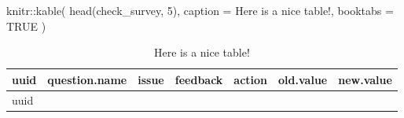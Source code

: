 \documentclass[
  letterpaper,
  DIV=11,
  numbers=noendperiod]{scrreprt}
\newenvironment{Shaded}{\begin{snugshade}}{\end{snugshade}}
\newcommand{\AttributeTok}[1]{\textcolor[rgb]{0.40,0.45,0.13}{#1}}
\newcommand{\ConstantTok}[1]{\textcolor[rgb]{0.56,0.35,0.01}{#1}}
\newcommand{\DecValTok}[1]{\textcolor[rgb]{0.68,0.00,0.00}{#1}}
\newcommand{\FunctionTok}[1]{\textcolor[rgb]{0.28,0.35,0.67}{#1}}
\newcommand{\NormalTok}[1]{\textcolor[rgb]{0.00,0.23,0.31}{#1}}
\newcommand{\SpecialCharTok}[1]{\textcolor[rgb]{0.37,0.37,0.37}{#1}}
\newcommand{\StringTok}[1]{\textcolor[rgb]{0.13,0.47,0.30}{#1}}
\begin{document}
\begin{Shaded}
\begin{Highlighting}[]
\NormalTok{knitr}\SpecialCharTok{::}\FunctionTok{kable}\NormalTok{(}
  \FunctionTok{head}\NormalTok{(check\_survey, }\DecValTok{5}\NormalTok{), }\AttributeTok{caption =} \StringTok{\textquotesingle{}Here is a nice table!\textquotesingle{}}\NormalTok{,}
  \AttributeTok{booktabs =} \ConstantTok{TRUE}
\NormalTok{)}
\end{Highlighting}
\end{Shaded}

\begin{longtable}[]{@{}
  >{\raggedright\arraybackslash}p{}
  >{\raggedright\arraybackslash}p{}
  >{\raggedright\arraybackslash}p{}
  >{\raggedright\arraybackslash}p{}
  >{\raggedright\arraybackslash}p{}
  >{\raggedright\arraybackslash}p{}
  >{\raggedright\arraybackslash}p{}@{}}
\caption{Here is a nice table!}\tabularnewline
\toprule\noalign{}
\begin{minipage}[b]{\linewidth}\raggedright
uuid
\end{minipage} & \begin{minipage}[b]{\linewidth}\raggedright
question.name
\end{minipage} & \begin{minipage}[b]{\linewidth}\raggedright
issue
\end{minipage} & \begin{minipage}[b]{\linewidth}\raggedright
feedback
\end{minipage} & \begin{minipage}[b]{\linewidth}\raggedright
action
\end{minipage} & \begin{minipage}[b]{\linewidth}\raggedright
old.value
\end{minipage} & \begin{minipage}[b]{\linewidth}\raggedright
new.value
\end{minipage} \\
\midrule\noalign{}
\endfirsthead
\toprule\noalign{}
\begin{minipage}[b]{\linewidth}\raggedright
uuid
\end{minipage} & \begin{minipage}[b]{\linewidth}\raggedright

\end{minipage}
\end{longtable}
\end{document}
